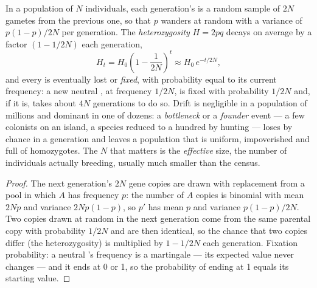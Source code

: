 \begin{theorem}\label{thm:b2:population-genetics:drift}
In a population of $N$  individuals, each generation's
 is a random sample of $2N$ gametes from the
previous one, so that $p$ wanders at random with a variance of
$p(1 - p)/2N$ per generation. The \emph{heterozygosity} $H = 2pq$
decays on average by a factor $(1 - 1/2N)$ each generation,
\[
H_t = H_0\left(1 - \frac{1}{2N}\right)^{t} \approx H_0\,e^{-t/2N},
\]
and every  is eventually lost or \emph{fixed}, with
probability equal to its current frequency: a new neutral ,
at frequency $1/2N$, is fixed with probability $1/2N$ and, if it is,
takes about $4N$ generations to do so. Drift is negligible in a
population of millions and dominant in one of dozens: a
\emph{bottleneck} or a \emph{founder} event --- a few colonists on an
island, a species reduced to a hundred by hunting --- loses 
by chance in a generation and leaves a population that is uniform,
impoverished and full of homozygotes. The $N$ that matters is the
\emph{effective} size, the number of individuals actually breeding,
usually much smaller than the census.
\end{theorem}
\begin{proof}
The next generation's $2N$ gene copies are drawn with replacement
from a pool in which $A$ has frequency $p$: the number of $A$ copies
is binomial with mean $2Np$ and variance $2Np(1 - p)$, so $p'$ has
mean $p$ and variance $p(1 - p)/2N$. Two copies drawn at random in
the next generation come from the same parental copy with
probability $1/2N$ and are then identical, so the chance that two
copies differ (the heterozygosity) is multiplied by $1 - 1/2N$ each
generation. Fixation probability: a neutral 's frequency is a
martingale --- its expected value never changes --- and it ends at 0
or 1, so the probability of ending at 1 equals its starting value.
\end{proof}

